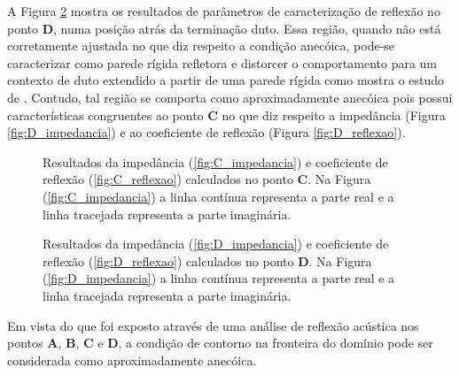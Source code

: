 A Figura \ref{fig:resultados_D} mostra os resultados de parâmetros de caracterização de reflexão no ponto \textbf{D}, numa posição atrás da terminação duto. Essa região, quando não está corretamente ajustada no que diz respeito a condição anecóica, pode-se caracterizar como parede rígida refletora e distorcer o comportamento para um contexto de duto extendido a partir de uma parede rígida como mostra o estudo de . Contudo, tal região se comporta como aproximadamente anecóica pois possui características congruentes ao ponto \textbf{C} no que diz respeito a impedância (Figura \ref{fig:D_impedancia}) e ao coeficiente de reflexão (Figura \ref{fig:D_reflexao}).

\begin{figure}
\begin{subfigure}{\scaleA \textwidth}
  
\end{subfigure}%
\begin{subfigure}{\scaleA \textwidth}
  
\end{subfigure}
\caption[Resultados de reflexão no ponto \textbf{C}]{Resultados da impedância (\ref{fig:C_impedancia}) e coeficiente de reflexão (\ref{fig:C_reflexao}) calculados no ponto $\textbf{C}$. Na Figura (\ref{fig:C_impedancia}) a linha contínua representa a parte real e a linha tracejada representa a parte imaginária.}
\label{fig:resultados_C}
\end{figure}

\begin{figure}
\begin{subfigure}{\scaleA \textwidth}
  
\end{subfigure}%
\begin{subfigure}{\scaleA \textwidth}
  
\end{subfigure}
\caption[Resultados de reflexão no ponto \textbf{D}]{Resultados da impedância (\ref{fig:D_impedancia}) e coeficiente de reflexão (\ref{fig:D_reflexao}) calculados no ponto $\textbf{D}$. Na Figura (\ref{fig:D_impedancia}) a linha contínua representa a parte real e a linha tracejada representa a parte imaginária.}
\label{fig:resultados_D}
\end{figure}

\newpage
Em vista do que foi exposto através de uma análise de reflexão acústica nos pontos \textbf{A}, \textbf{B}, \textbf{C} e \textbf{D}, a condição de contorno na fronteira do domínio pode ser considerada como aproximadamente anecóica.

